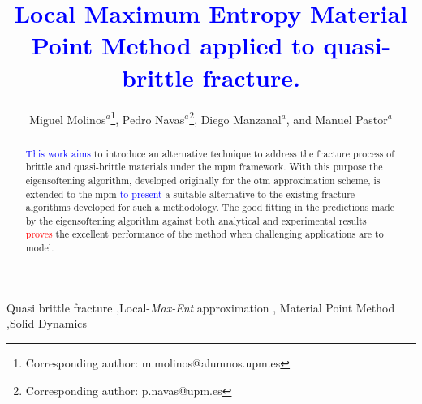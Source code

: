 \documentclass[preprint,12pt,a4paper]{elsarticle}
\begin{document}
\begin{frontmatter}


\title{\textcolor{blue}{Local Maximum Entropy Material Point Method applied to quasi-brittle fracture.} }



\author{
Miguel Molinos$^a$\footnote{Corresponding author: m.molinos@alumnos.upm.es},
Pedro Navas$^a$\footnote{Corresponding author: p.navas@upm.es},
Diego Manzanal$^a$,
and Manuel Pastor$^a$
 }
 \address{
 $^a$ ETSI Caminos, Canales y Puertos, Universidad Polit\'ectnica de Madrid.\\
 c. Prof. Aranguren 3, 28040 Madrid, Spain
}

\begin{abstract}
  \textcolor{blue}{This work aims} to introduce an alternative
  technique to address the fracture process of brittle and
  quasi-brittle materials under the \acrfull{mpm} 
  framework. With this purpose the eigensoftening algorithm, developed
  originally for the \acrfull{otm} approximation scheme, is extended
  to the \acrshort{mpm} \textcolor{blue}{to present} a suitable alternative
  to the existing fracture algorithms developed for such a methodology. 
  The good fitting in the predictions made by the eigensoftening algorithm against both analytical and experimental results \textcolor{red}{proves} the excellent performance of the method when challenging applications are to model.
\end{abstract}

\begin{keyword}
Quasi brittle fracture \sep Local-\textit{Max-Ent} approximation \sep
Material Point Method \sep Solid Dynamics
\end{keyword}

\end{frontmatter}

\linenumbers

\end{document}
